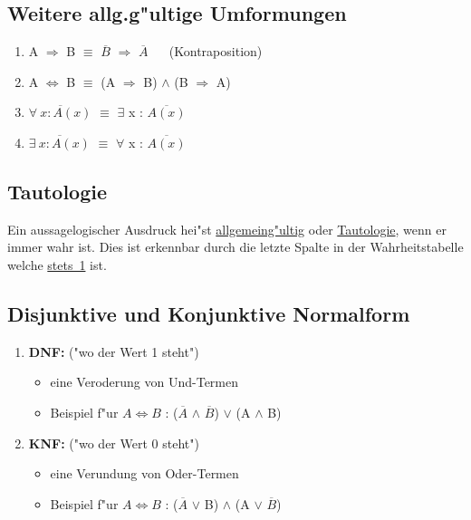 \documentclass[10pt,a4paper,landscape]{article}
\begin{document}
\begin{multicols*}{3}
		\subsection{Weitere allg.g"ultige Umformungen}
		\begin{enumerate}
			\item A $\Rightarrow$ B $\equiv$ $\overline{B}$ $\Rightarrow$ $\overline{A}$ $\quad$ (Kontraposition) 
			\item A $\Leftrightarrow$ B $\equiv$ (A $\Rightarrow$ B) $\land$ (B $\Rightarrow$ A)
			\item $\overline{\forall~x : A(x)} $ $\equiv$ $\exists$ x : $\overline{A(x)}$ 
			\item $\overline{\exists~x : A(x)}$ $\equiv$ $\forall$ x : $\overline{A(x)}$ 
		\end{enumerate}
		\subsection{Tautologie}
		Ein aussagelogischer Ausdruck hei"st \uline{allgemeing"ultig} oder \uline{Tautologie}, wenn er immer wahr ist. Dies ist erkennbar durch die letzte Spalte in der Wahrheitstabelle welche \uline{stets~1} ist.
		
		\subsection{Disjunktive und Konjunktive Normalform}
		\begin{enumerate}
			\item \textbf{DNF:} ("wo der Wert 1 steht") 
			\begin{itemize}
				\item eine Veroderung von Und-Termen
				\item Beispiel f"ur $A \Leftrightarrow B$ : ($\overline{A}$ $\land$ $\overline{B}$) $\lor$ (A $\land$ B)
			\end{itemize}
			\item \textbf{KNF:} ("wo der Wert 0 steht")
			\begin{itemize}
				\item eine Verundung von Oder-Termen
				\item Beispiel f"ur $A \Leftrightarrow B$ : ($\overline{A}$ $\lor$ B) $\land$ (A $\lor$ $\overline{B}$)
			\end{itemize}
		\end{enumerate}
		

\end{multicols*}
\end{document}
